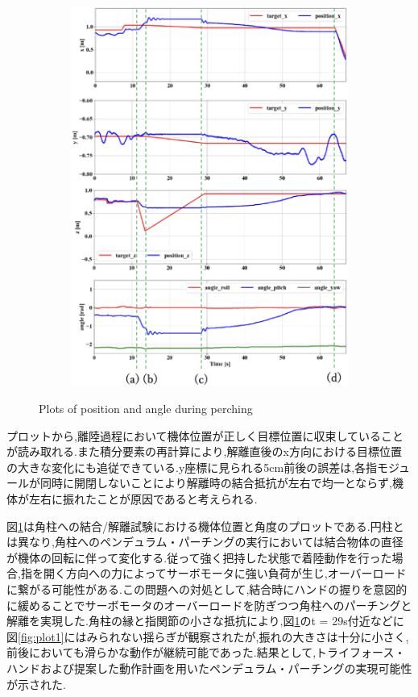 \documentclass{jarticle}
\begin{document}
\begin{figure}[H]
\begin{subfigure}{0.38\columnwidth}
    \includegraphics[width=\textwidth]{figs/plot2.eps}
    \vspace{-6mm}
    \caption{}
    \label{fig:plot2}
  \end{subfigure}
  \vspace{1mm}
  \caption{Plots of position and angle during perching}
  \label{fig:plot}
  \vspace{-2mm}
\end{figure}

プロットから,離陸過程において機体位置が正しく目標位置に収束していることが読み取れる.また積分要素の再計算により,解離直後のx方向における目標位置の大きな変化にも追従できている.y座標に見られる5cm前後の誤差は,各指モジュールが同時に開閉しないことにより解離時の結合抵抗が左右で均一とならず,機体が左右に振れたことが原因であると考えられる.

図\ref{fig:plot2}は角柱への結合/解離試験における機体位置と角度のプロットである.円柱とは異なり,角柱へのペンデュラム・パーチングの実行においては結合物体の直径が機体の回転に伴って変化する.従って強く把持した状態で着陸動作を行った場合,指を開く方向への力によってサーボモータに強い負荷が生じ,オーバーロードに繋がる可能性がある.この問題への対処として,結合時にハンドの握りを意図的に緩めることでサーボモータのオーバーロードを防ぎつつ角柱へのパーチングと解離を実現した.角柱の縁と指関節の小さな抵抗により,図\ref{fig:plot2}のt = 29s付近などに図\ref{fig:plot1}にはみられない揺らぎが観察されたが,振れの大きさは十分に小さく,前後においても滑らかな動作が継続可能であった.結果として,トライフォース・ハンドおよび提案した動作計画を用いたペンデュラム・パーチングの実現可能性が示された.
\end{document}
